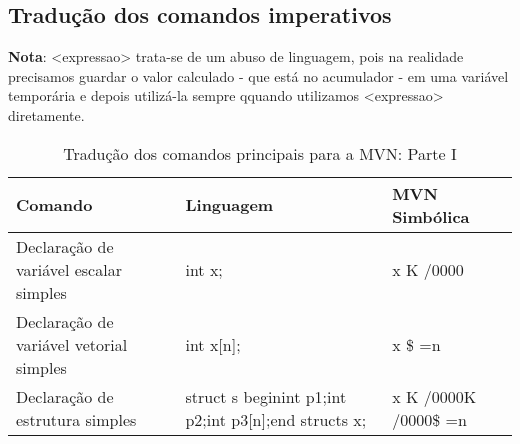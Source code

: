 
\subsection{Tradução dos comandos imperativos}

\textbf{Nota}: <expressao> trata-se de um abuso de linguagem, pois na realidade precisamos guardar o valor calculado - que está no acumulador - em uma variável temporária e depois utilizá-la sempre qquando utilizamos <expressao> diretamente.

\begin{table}[H]

	\begin{tabular}{ | p{3cm} | p{5cm} | p{5cm}|}
	\rowcolor{non-photoblue}
	\textbf{Comando} & \textbf{Linguagem} & \textbf{MVN Simbólica} \\
	
	\hline
	
	Declaração de variável escalar simples & int x; & x K /0000 \\

	Declaração de variável vetorial simples & int x[n]; & x \$ =n \\

	Declaração de estrutura simples & struct s begin\newline int p1;\newline int p2;\newline int p3[n];\newline end struct\newline\newline s x; & x K /0000\newline K /0000\newline \$ =n \\

	\hline
	\end{tabular}
	\caption{Tradução dos comandos principais para a MVN: Parte I}
\end{table}


